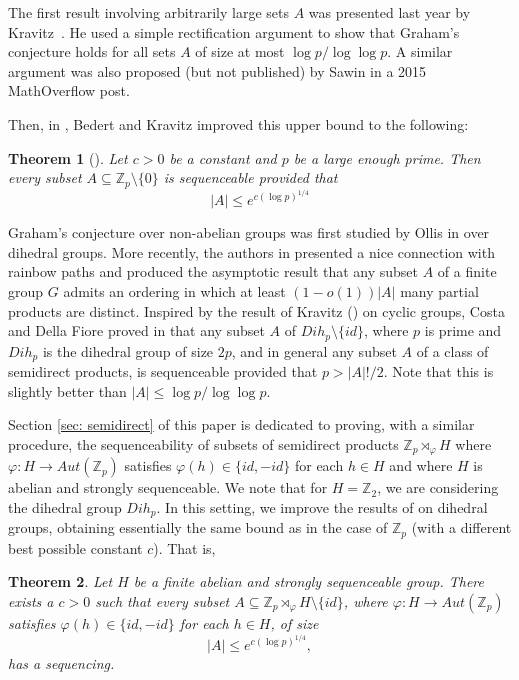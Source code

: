 \documentclass[11pt]{amsart}
\newtheorem{theorem}{Theorem}[section]
\theoremstyle{definition}
\begin{document}
The first result involving arbitrarily large sets $A$ was presented last year by Kravitz~\cite{NK}. He used a simple rectification argument to show that Graham's conjecture holds for all sets $A$ of size at most $\log p/\log\log p$. A similar argument was also proposed (but not published) by Sawin \cite{Sawin} in a 2015 MathOverflow post. 

Then, in \cite{BK}, Bedert and Kravitz improved this upper bound to the following:
\begin{theorem}[\cite{BK}]\label{thm:mainBK}
Let $c>0$ be a constant and $p$ be a large enough prime. Then every subset $A \subseteq \mathbb{Z}_p \setminus\{0\}$ is sequenceable provided that
$$ |A| \leq e^{c(\log p)^{1/4}}$$
\end{theorem}

Graham's conjecture over non-abelian groups was first studied by Ollis in \cite{OllisDi} over dihedral groups. More recently, the authors in \cite{BFMPY} presented a nice connection with rainbow paths and produced the asymptotic result that any subset $A$ of a finite group $G$ admits an ordering in which at least $(1-o(1))|A|$ many partial products are distinct. Inspired by the result of Kravitz (\cite{NK}) on cyclic groups, Costa and Della Fiore proved in \cite{CDF} that any subset $A$ of $Dih_{p}\setminus\{id\}$, where $p$ is prime and $Dih_p$ is the dihedral group of size $2p$, and in general any subset $A$ of a class of semidirect products, is sequenceable provided that $p>|A|!/2$. Note that this is slightly better than $|A|\leq \log p/\log\log p$.

Section \ref{sec: semidirect} of this paper is dedicated to proving, with a similar procedure, the sequenceability of subsets of semidirect products $\mathbb{Z}_p \rtimes_{\varphi} H$ where $\varphi: H \to Aut(\mathbb{Z}_p)$ satisfies $\varphi(h) \in \{id, -id\}$ for each $h \in H$ and where $H$ is abelian and strongly sequenceable. We note that for $H = \mathbb{Z}_2$, we are considering  the dihedral group $Dih_p$. In this setting, we improve the results of \cite{CDF} on dihedral groups, obtaining essentially the same bound as in the case of $\mathbb{Z}_p$ (with a different best possible constant $c$). That is, 
\begin{theorem}\label{thm:main2}
Let $H$ be a finite abelian and strongly sequenceable group. There exists a $c > 0$ such that every subset $A \subseteq \mathbb{Z}_p \rtimes_{\varphi} H \setminus \{id\}$, where $\varphi: H \to Aut(\mathbb{Z}_p)$ satisfies $\varphi(h) \in \{id, -id\}$ for each $h \in H$, of size
$$ |A| \leq e^{c(\log p)^{1/4}},$$
has a sequencing.
\end{theorem}
\end{document}
